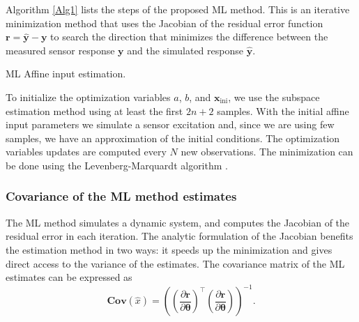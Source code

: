 Algorithm \ref{Alg1} lists the steps of the proposed ML method.
This is an iterative minimization method that uses the Jacobian of the residual error function $\mathbf{r} = \widehat{\mathbf{y}} - \mathbf{y}$ to search the direction that minimizes the difference between the measured sensor response $\mathbf{y}$ and the simulated response $\widehat{\mathbf{y}}$.

\begin{algorithm}
\caption{ML Affine input estimation.}\label{Alg1}
\begin{algorithmic}
\ENDFOR
{}

\end{algorithmic}
\end{algorithm}

To initialize the optimization variables $a$, $b$, and $\mathbf{x}_{\text{ini}}$,
we use the subspace estimation method using at least the first $2n+2$ samples.
With the initial affine input parameters we simulate a sensor excitation and, since we are using few samples, we have an approximation of the initial conditions.
The optimization variables updates are computed every $N$ new observations.
The minimization can be done using the Levenberg-Marquardt algorithm \cite{Nocedal06}. 


\subsubsection{Covariance of the ML method estimates}

The ML method simulates a dynamic system, and computes the Jacobian of the residual error in each iteration.
The analytic formulation of the Jacobian benefits the estimation method in two ways: it speeds up the minimization and gives direct access to the variance of the estimates.
The covariance matrix of the ML estimates can be expressed as \cite{Pintelon12Book}
\begin{equation} \mathbf{Cov} \left( \widehat{x} \right) = \left( \left( \dfrac{\partial \mathbf{r} }{ \partial \mathbf{\theta} } \right)^\top \left( \dfrac{\partial \mathbf{r} }{ \partial \mathbf{\theta} } \right) \right)^{-1}. \label{eqn:covOpt} \end{equation}


